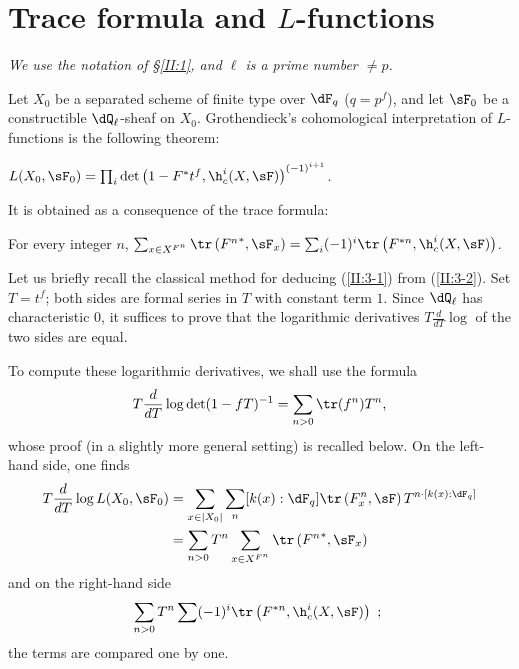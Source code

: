 \section{Trace formula and \texorpdfstring{$L$}{L}-functions}\label{II:3}

\emph{We use the notation of \S\ref{II:1}, and $\ell$ is a prime number
$\ne p$.}

Let $X_0$ be a separated scheme of finite type over $\dF_q$ ($q=p^f$), and
let $\sF_0$ be a constructible $\dQ_\ell$-sheaf on $X_0$. Grothendieck's
cohomological interpretation of $L$-functions is the following theorem:






\begin{theorem_}\label{II:3-1}
$L(X_0,\sF_0) = \prod_i \det\left(1-F^* t^f, \h_c^i(X,\sF)\right)^{(-1)^{i+1}}$.
\end{theorem_}

It is obtained as a consequence of the trace formula:






\begin{theorem_}\label{II:3-2}
For every integer $n$,
$\sum_{x\in X^{F^n}} \tr\left({F^n}^*,\sF_x\right) = \sum_i (-1)^i \tr\left(F^{*n},\h_c^i(X,\sF)\right)$.
\end{theorem_}






Let us briefly recall the classical method for deducing (\ref{II:3-1}) from
(\ref{II:3-2}). Set $T=t^f$; both sides are formal series in $T$ with
constant term $1$. Since $\dQ_\ell$ has characteristic $0$, it suffices to
prove that the logarithmic derivatives $T\frac{d}{dT}\log$ of the two sides
are equal.

To compute these logarithmic derivatives, we shall use the formula
\[
  T \frac{d}{dT}\log\det(1-f T)^{-1} = \sum_{n>0} \tr(f^n) T^n \text{,}
\]
whose proof (in a slightly more general setting) is recalled below. On the
left-hand side, one finds
\begin{align*}
  T\frac{d}{dT}\log L(X_0,\sF_0)
    &= \sum_{x\in |X_0|} \sum_n [k(x):\dF_q] \tr\left(F_x^n,\sF\right) T^{n\cdot[k(x):\dF_q]} \\
    &= \sum_{n>0} T^n \sum_{x\in X^{F^n}} \tr\left({F^n}^*,\sF_x\right)
\end{align*}
and on the right-hand side
\[
  \sum_{n>0} T^n \sum (-1)^i \tr\left(F^{*n},\h_c^i(X,\sF)\right) \text{ ; }
\]
the terms are compared one by one.






